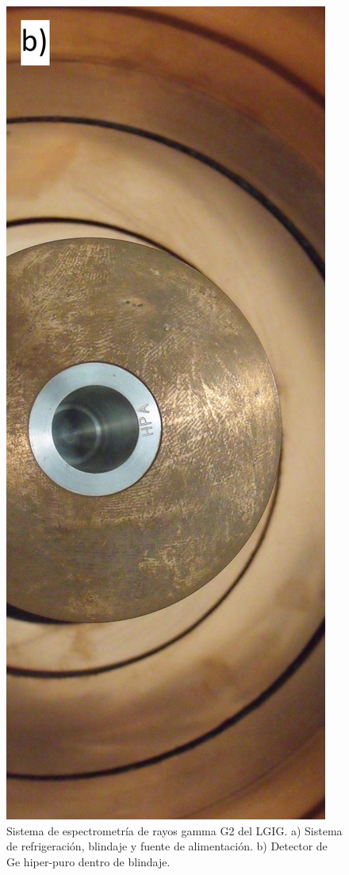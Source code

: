 \begin{figure}[h]
\includegraphics[height=0.4\textheight]{Imagenes/DSCF1886.jpg}
\caption{Sistema de espectrometría de rayos gamma G2 del LGIG. a) Sistema de refrigeración, blindaje y fuente de alimentación. b) Detector de Ge hiper-puro dentro de blindaje.}\label{Fig-G1System}
\end{figure}
